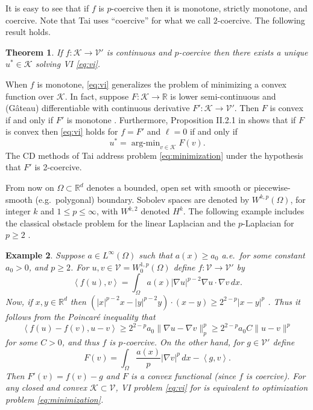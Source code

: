 \documentclass[letterpaper,final,12pt,reqno]{amsart}
\theoremstyle{cstyle}
\newtheorem{theorem}{Theorem}
\theoremstyle{cstyle*}
\theoremstyle{dstyle}
\newtheorem{example}[theorem]{Example}
\numberwithin{equation}{section}
\numberwithin{figure}{section}
\numberwithin{table}{section}
\numberwithin{theorem}{section}
\newcommand{\RR}{\mathbb{R}}
\newcommand{\grad}{\nabla}
\newcommand{\cK}{\mathcal{K}}
\newcommand{\cV}{\mathcal{V}}
\newcommand{\ip}[2]{\left<#1,#2\right>}
\begin{document}
It is easy to see that if $f$ is $p$-coercive then it is monotone, strictly monotone, and coercive.  Note that Tai \cite{Tai2003} uses ``coercive'' for what we call $2$-coercive.  The following result holds.

\begin{theorem}  \label{thm:viwellposed}  If $f:\cK \to \cV'$ is continuous and $p$-coercive then there exists a unique $u^*\in \cK$ solving VI \eqref{eq:vi}.
\end{theorem}

When $f$ is monotone, \eqref{eq:vi} generalizes the problem of minimizing a convex function over $\cK$.  In fact, suppose $F:\cK \to \RR$ is lower semi-continuous and (G\^ateau) differentiable with continuous derivative $F':\cK \to \cV'$.  Then $F$ is convex if and only if $F'$ is monotone \cite[Proposition I.5.5]{EkelandTemam1976}.  Furthermore, Proposition II.2.1 in \cite{EkelandTemam1976} shows that if $F$ is convex then \eqref{eq:vi} holds for $f=F'$ and $\ell=0$ if and only if
\begin{equation}
u^* = \operatorname{arg-min}_{v\in\cK} F(v). \label{eq:minimization}
\end{equation}
The CD methods of Tai \cite{Tai2003} address problem \eqref{eq:minimization} under the hypothesis that $F'$ is 2-coercive.

From now on $\Omega \subset \RR^d$ denotes a bounded, open set with smooth or piecewise-smooth (e.g.~polygonal) boundary.  Sobolev spaces \cite{Evans2010} are denoted by $W^{k,p}(\Omega)$, for integer $k$ and $1\le p \le \infty$, with $W^{k,2}$ denoted $H^k$.  The following example includes the classical obstacle problem for the linear Laplacian \cite{GraeserKornhuber2009} and the $p$-Laplacian for $p\ge 2$ \cite{ChoeLewis1991}.

\begin{example}  \label{ex:plaplacian}  Suppose $a\in L^\infty(\Omega)$ such that $a(x)\ge a_0$ a.e.~for some constant $a_0>0$, and $p\ge 2$.  For $u,v \in \cV = W^{1,p}_0(\Omega)$ define $f:\cV \to \cV'$ by
\begin{equation}
\ip{f(u)}{v} = \int_\Omega a(x) |\grad u|^{p-2} \grad u \cdot \grad v\,dx. \label{eq:plaplacian}
\end{equation}
Now, if $x,y\in\RR^d$ then $(|x|^{p-2} x - |y|^{p-2} y)\cdot (x-y) \ge 2^{2-p} |x-y|^p$ \cite[see Appendix A and references therein]{Bueler2021conservation}.  Thus it follows from the Poincar\'e inequality that
    $$\ip{f(u) - f(v)}{u-v} \ge 2^{2-p} a_0 \|\grad u - \grad v\|_p^p \ge 2^{2-p} a_0 C \|u-v\|^p$$
for some $C>0$, and thus $f$ is $p$-coercive.  On the other hand, for $g\in\cV'$ define
    $$F(v) = \int_\Omega \frac{a(x)}{p} |\grad v|^p\,dx - \ip{g}{v}.$$
Then $F'(v) = f(v) - g$ and $F$ is a convex functional (since $f$ is coercive).  For any closed and convex $\cK\subset \cV$, VI problem \eqref{eq:vi} for is equivalent to optimization problem \eqref{eq:minimization}.\end{example}
\end{document}
